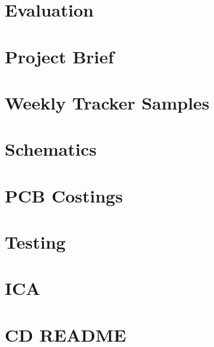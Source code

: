 \documentclass[a4paper, 12pt]{report}
\begin{document}




\chapter{Evaluation}





\nocite{*}



\appendix
\chapter{Project Brief}

\chapter{Weekly Tracker Samples}

\chapter{Schematics}

\chapter{PCB Costings}

\chapter{Testing}

\chapter{ICA}


\chapter{CD README}

\end{document}
